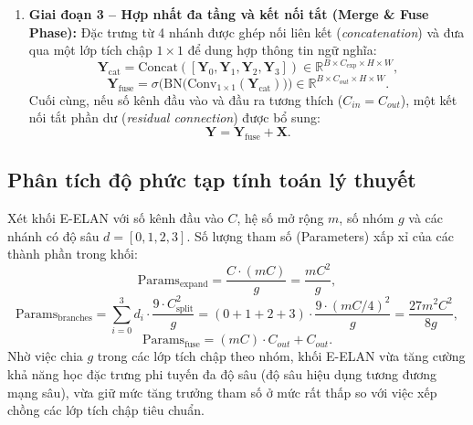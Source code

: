 \documentclass[fontsize=13pt,a4paper,oneside,DIV=calc,chapterprefix=true]{scrbook}
\begin{document}
\begin{enumerate}[leftmargin=1.2cm]
    \item \textbf{Giai đoạn 3 -- Hợp nhất đa tầng và kết nối tắt (Merge \& Fuse Phase):}
    Đặc trưng từ 4 nhánh được ghép nối liên kết (\textit{concatenation}) và đưa qua một lớp tích chập $1 \times 1$ để dung hợp thông tin ngữ nghĩa:
    \begin{equation}
    \mathbf{Y}_{\text{cat}} = \mathrm{Concat}([\mathbf{Y}_0, \mathbf{Y}_1, \mathbf{Y}_2, \mathbf{Y}_3]) \in \mathbb{R}^{B \times C_{\exp} \times H \times W},
    \end{equation}
    \begin{equation}
    \mathbf{Y}_{\text{fuse}} = \sigma\Big(\mathrm{BN}\big(\mathrm{Conv}_{1\times 1}(\mathbf{Y}_{\text{cat}})\big)\Big) \in \mathbb{R}^{B \times C_{out} \times H \times W}.
    \end{equation}
    Cuối cùng, nếu số kênh đầu vào và đầu ra tương thích ($C_{in} = C_{out}$), một kết nối tắt phần dư (\textit{residual connection}) được bổ sung:
    \begin{equation}
    \mathbf{Y} = \mathbf{Y}_{\text{fuse}} + \mathbf{X}.
    \end{equation}
\end{enumerate}

\subsection{Phân tích độ phức tạp tính toán lý thuyết}
Xét khối E-ELAN với số kênh đầu vào $C$, hệ số mở rộng $m$, số nhóm $g$ và các nhánh có độ sâu $d = [0, 1, 2, 3]$. 
Số lượng tham số (Parameters) xấp xỉ của các thành phần trong khối:
\begin{equation}
\text{Params}_{\text{expand}} = \frac{C \cdot (mC)}{g} = \frac{m C^2}{g},
\end{equation}
\begin{equation}
\text{Params}_{\text{branches}} = \sum_{i=0}^3 d_i \cdot \frac{9 \cdot C_{\text{split}}^2}{g} = (0 + 1 + 2 + 3) \cdot \frac{9 \cdot (mC/4)^2}{g} = \frac{27 m^2 C^2}{8g},
\end{equation}
\begin{equation}
\text{Params}_{\text{fuse}} = (mC) \cdot C_{out} + C_{out}.
\end{equation}
Nhờ việc chia $g$ trong các lớp tích chập theo nhóm, khối E-ELAN vừa tăng cường khả năng học đặc trưng phi tuyến đa độ sâu (độ sâu hiệu dụng tương đương mạng sâu), vừa giữ mức tăng trưởng tham số ở mức rất thấp so với việc xếp chồng các lớp tích chập tiêu chuẩn.
\end{document}
